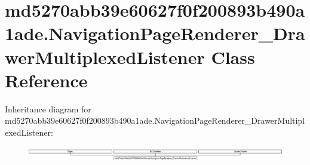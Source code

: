 \hypertarget{classmd5270abb39e60627f0f200893b490a1ade_1_1NavigationPageRenderer__DrawerMultiplexedListener}{}\section{md5270abb39e60627f0f200893b490a1ade.\+Navigation\+Page\+Renderer\+\_\+\+Drawer\+Multiplexed\+Listener Class Reference}
\label{classmd5270abb39e60627f0f200893b490a1ade_1_1NavigationPageRenderer__DrawerMultiplexedListener}
Inheritance diagram for md5270abb39e60627f0f200893b490a1ade.\+Navigation\+Page\+Renderer\+\_\+\+Drawer\+Multiplexed\+Listener\+:\begin{figure}[H]
\begin{center}
\leavevmode
\includegraphics[height=0.660767cm]{classmd5270abb39e60627f0f200893b490a1ade_1_1NavigationPageRenderer__DrawerMultiplexedListener}
\end{center}
\end{figure}
